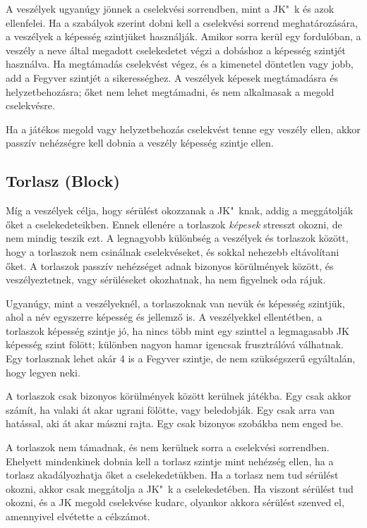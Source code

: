 A veszélyek ugyanúgy jönnek a cselekvési sorrendben, mint a JK"~k és azok ellenfelei. Ha a szabályok szerint dobni kell a cselekvési sorrend meghatározására, a veszélyek a képesség szintjüket használják. Amikor sorra kerül egy fordulóban, a veszély a neve által megadott cselekedetet végzi a dobáshoz a képesség szintjét használva. Ha megtámadás cselekvést végez, és a kimenetel döntetlen vagy jobb, add a Fegyver szintjét a sikerességhez. A veszélyek képesek megtámadásra és helyzetbehozásra; őket nem lehet megtámadni, és nem alkalmasak a megold cselekvésre.

Ha a játékos megold vagy helyzetbehozás cselekvést tenne egy veszély ellen, akkor passzív nehézségre kell dobnia a veszély képesség szintje ellen.

\newpage

\subsection[Torlasz]{Torlasz (Block)}

Míg a veszélyek célja, hogy sérülést okozzanak a JK"~knak, addig a  meggátolják őket a cselekedeteikben. Ennek ellenére a torlaszok \emph{képesek} stresszt okozni, de nem mindig teszik ezt. A legnagyobb különbség a veszélyek és torlaszok között, hogy a torlaszok nem csinálnak cselekvéseket, és sokkal nehezebb eltávolítani őket. A torlaszok passzív nehézséget adnak bizonyos körülmények között, és veszélyeztetnek, vagy sérüléseket okozhatnak, ha nem figyelnek oda rájuk.

Ugyanúgy, mint a veszélyeknél, a torlaszoknak van nevük és képesség szintjük, ahol a név egyszerre képesség és jellemző is. A veszélyekkel ellentétben, a torlaszok képesség szintje jó, ha nincs több mint egy szinttel a legmagasabb JK képesség szint fölött; különben nagyon hamar igencsak frusztrálóvá válhatnak. Egy torlasznak lehet akár 4 is a Fegyver szintje, de nem szükségszerű egyáltalán, hogy legyen neki.

A torlaszok csak bizonyos körülmények között kerülnek játékba. Egy  csak akkor számít, ha valaki át akar ugrani fölötte, vagy beledobják. Egy  csak arra van hatással, aki át akar mászni rajta. Egy  csak bizonyos szobákba nem enged be.

A torlaszok nem támadnak, és nem kerülnek sorra a cselekvési sorrendben. Ehelyett mindenkinek dobnia kell a torlasz szintje mint nehézség ellen, ha a torlasz akadályozhatja őket a cselekedetükben. Ha a torlasz nem tud sérülést okozni, akkor csak meggátolja a JK"~k a cselekedetében. Ha viszont sérülést tud okozni, és a JK megold cselekvése kudarc, olyankor akkora sérülést szenved el, amennyivel elvétette a célszámot.

